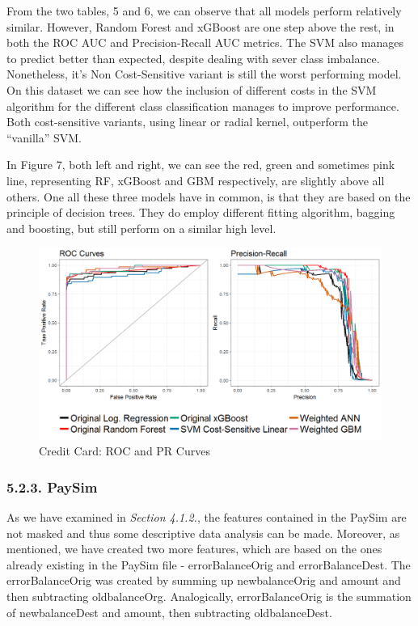 \documentclass[12pt,]{article}
\begin{document}
From the two tables, 5 and 6, we can observe that all models perform
relatively similar. However, Random Forest and xGBoost are one step
above the rest, in both the ROC AUC and Precision-Recall AUC metrics.
The SVM also manages to predict better than expected, despite dealing
with sever class imbalance. Nonetheless, it's Non Cost-Sensitive variant
is still the worst performing model. On this dataset we can see how the
inclusion of different costs in the SVM algorithm for the different
class classification manages to improve performance. Both cost-sensitive
variants, using linear or radial kernel, outperform the ``vanilla'' SVM.

In Figure 7, both left and right, we can see the red, green and
sometimes pink line, representing RF, xGBoost and GBM respectively, are
slightly above all others. One all these three models have in common, is
that they are based on the principle of decision trees. They do employ
different fitting algorithm, bagging and boosting, but still perform on
a similar high level.

\begin{figure}
\centering
\includegraphics[width=1\textwidth,height=\textheight]{figures/credit/cr_card_roc_pr.png}
\caption{Credit Card: ROC and PR Curves}
\end{figure}

\hypertarget{paysim-1}{%
\subsubsection{5.2.3. PaySim}\label{paysim-1}}

As we have examined in \emph{Section 4.1.2.}, the features contained in
the PaySim are not masked and thus some descriptive data analysis can be
made. Moreover, as mentioned, we have created two more features, which
are based on the ones already existing in the PaySim file -
errorBalanceOrig and errorBalanceDest. The errorBalanceOrig was created
by summing up newbalanceOrig and amount and then subtracting
oldbalanceOrg. Analogically, errorBalanceOrig is the summation of
newbalanceDest and amount, then subtracting oldbalanceDest.
\end{document}
